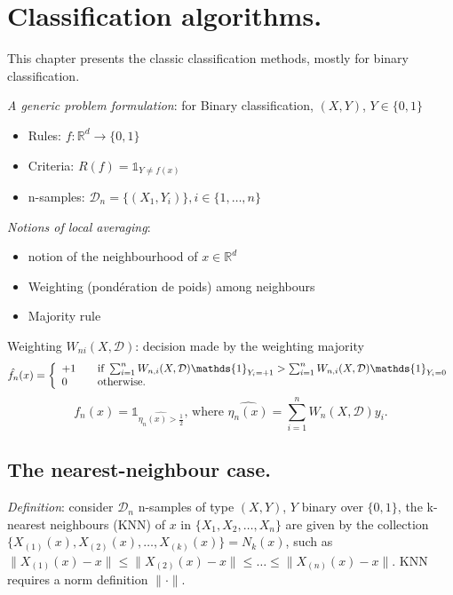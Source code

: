 \chapter{Classification algorithms.}

This chapter presents the classic classification methods, mostly for binary classification.

\emph{A generic problem formulation}: for Binary classification, $(X,Y)$, $Y \in \{0,1\}$  

\begin{itemize}
	\item Rules: $f : \mathbb{R}^d \rightarrow \{0, 1\}$
	\item Criteria: $R(f) = \mathds{1}_{Y \neq f(x)}$
	\item n-samples: $\mathcal{D}_n=\{(X_1,Y_i)\}, i\in\{1,\dots,n\}$
\end{itemize}


\emph{Notions of local averaging}:

\begin{itemize}
	\item notion of the neighbourhood of $x \in \mathbb{R}^d$ 
	\item Weighting (pondération de poids) among neighbours  
	\item Majority rule
\end{itemize}

Weighting $W_{ni}(X,\mathcal{D})$: decision made by the weighting majority
\[
	\hat{f_n}(x) = \left\{
			  \begin{array}{l l}
			    +1 & \quad \text{if } \sum_{i=1}^n W_{n,i}(X,\mathcal{D})\mathds{1}_{Y_i = +1} > \sum_{i=1}^n W_{n,i}(X,\mathcal{D})\mathds{1}_{Y_i = 0}\\
			    0 & \quad \text{otherwise.}\\
			  \end{array} \right.
\]
\[
	\hat{f_n}(x) = \mathds{1}_{\hat{{\eta}_n (x)>\frac{1}{2}}} \text{, where } \hat{{\eta}_n(x)}=\sum_{i=1}^n W_{n}(X,\mathcal{D})y_i.
\]



	\section{The nearest-neighbour case.}

		\emph{Definition}: consider $\mathcal{D}_n$ n-samples of type $(X,Y)$, $Y$ binary over $\{0,1\}$, the k-nearest neighbours (KNN) of $x$ in $\{X_1,X_2,\dots,X_n\}$ are given by the collection $\{X_{(1)}(x),X_{(2)}(x),\dots,X_{(k)}(x)\}=N_k(x)$, such as $\|X_{(1)}(x)-x\| \leq  \|X_{(2)}(x)-x\| \leq \dots \leq \|X_{(n)}(x)-x\|$. KNN requires a norm definition $\|\cdot
\|$.

